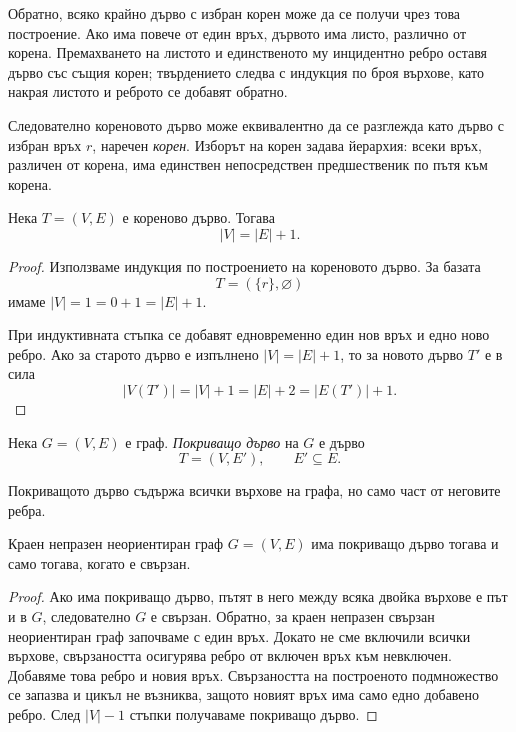 Обратно, всяко крайно дърво с избран корен може да се получи чрез това построение. Ако има повече от един връх, дървото има листо, различно от корена. Премахването на листото и единственото му инцидентно ребро оставя дърво със същия корен; твърдението следва с индукция по броя върхове, като накрая листото и реброто се добавят обратно.

Следователно кореновото дърво може еквивалентно да се разглежда като дърво с избран връх $r$, наречен \emph{корен}. Изборът на корен задава йерархия: всеки връх, различен от корена, има единствен непосредствен предшественик по пътя към корена.

\begin{thm}
Нека $T=(V,E)$ е кореново дърво. Тогава
\[
|V|=|E|+1.
\]
\end{thm}

\begin{proof}
Използваме индукция по построението на кореновото дърво. За базата
\[
T=(\{r\},\varnothing)
\]
имаме $|V|=1=0+1=|E|+1$.

При индуктивната стъпка се добавят едновременно един нов връх и едно ново ребро. Ако за старото дърво е изпълнено $|V|=|E|+1$, то за новото дърво $T'$ е в сила
\[
|V(T')|=|V|+1=|E|+2=|E(T')|+1.
\]
\end{proof}

\begin{defn}
Нека $G=(V,E)$ е граф. \emph{Покриващо дърво} на $G$ е дърво
\[
T=(V,E'),
\qquad E'\subseteq E.
\]
\end{defn}

Покриващото дърво съдържа всички върхове на графа, но само част от неговите ребра.

\begin{thm}
Краен непразен неориентиран граф $G=(V,E)$ има покриващо дърво тогава и само тогава, когато е свързан.
\end{thm}

\begin{proof}
Ако има покриващо дърво, пътят в него между всяка двойка върхове е път и в $G$, следователно $G$ е свързан. Обратно, за краен непразен свързан неориентиран граф започваме с един връх. Докато не сме включили всички върхове, свързаността осигурява ребро от включен връх към невключен. Добавяме това ребро и новия връх. Свързаността на построеното подмножество се запазва и цикъл не възниква, защото новият връх има само едно добавено ребро. След $|V|-1$ стъпки получаваме покриващо дърво.
\end{proof}

